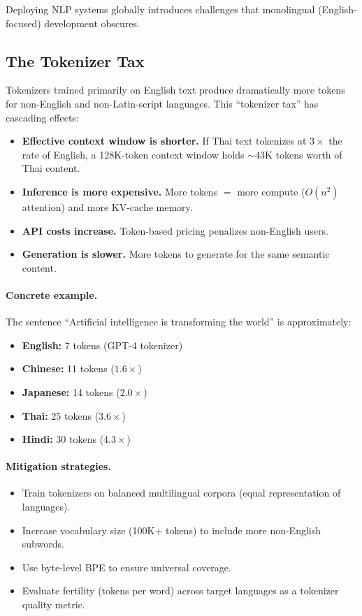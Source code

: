 Deploying NLP systems globally introduces challenges that monolingual (English-focused)
development obscures.

\subsection{The Tokenizer Tax}
\label{sec:tokenizer_tax}

Tokenizers trained primarily on English text produce dramatically more tokens for
non-English and non-Latin-script languages.  This ``tokenizer tax'' has cascading
effects:

\begin{itemize}
    \item \textbf{Effective context window is shorter.}  If Thai text tokenizes at
          $3\times$ the rate of English, a 128K-token context window holds
          $\sim$43K tokens worth of Thai content.
    \item \textbf{Inference is more expensive.}  More tokens $=$ more compute
          ($O(n^2)$ attention) and more KV-cache memory.
    \item \textbf{API costs increase.}  Token-based pricing penalizes non-English users.
    \item \textbf{Generation is slower.}  More tokens to generate for the same semantic
          content.
\end{itemize}

\paragraph{Concrete example.}
The sentence ``Artificial intelligence is transforming the world'' is approximately:
\begin{itemize}
    \item \textbf{English:} 7 tokens (GPT-4 tokenizer)
    \item \textbf{Chinese:} 11 tokens ($1.6\times$)
    \item \textbf{Japanese:} 14 tokens ($2.0\times$)
    \item \textbf{Thai:} 25 tokens ($3.6\times$)
    \item \textbf{Hindi:} 30 tokens ($4.3\times$)
\end{itemize}

\paragraph{Mitigation strategies.}
\begin{itemize}
    \item Train tokenizers on balanced multilingual corpora (equal representation of
          languages).
    \item Increase vocabulary size (100K+ tokens) to include more non-English subwords.
    \item Use byte-level BPE to ensure universal coverage.
    \item Evaluate fertility (tokens per word) across target languages as a tokenizer
          quality metric.
\end{itemize}

